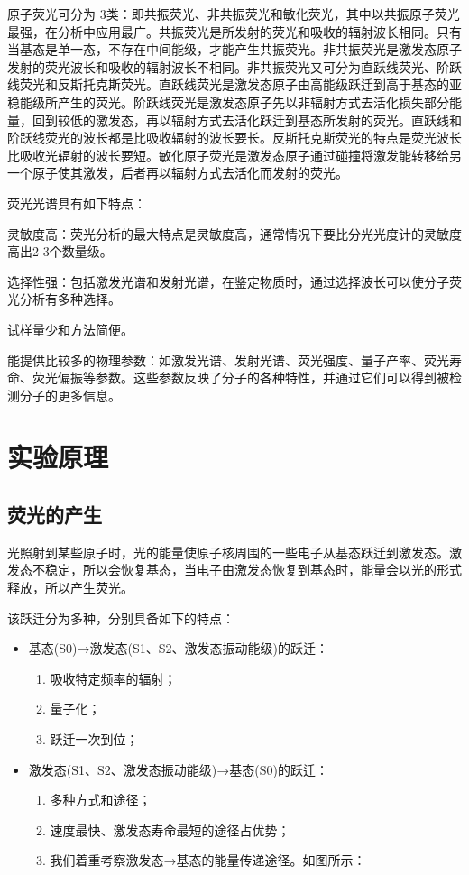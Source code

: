 \documentclass[hyperref]{ctexart}
\begin{document}
\begin{multicols}{2}
		原子荧光可分为 3类：即共振荧光、非共振荧光和敏化荧光，其中以共振原子荧光最强，在分析中应用最广。共振荧光是所发射的荧光和吸收的辐射波长相同。只有当基态是单一态，不存在中间能级，才能产生共振荧光。非共振荧光是激发态原子发射的荧光波长和吸收的辐射波长不相同。非共振荧光又可分为直跃线荧光、阶跃线荧光和反斯托克斯荧光。直跃线荧光是激发态原子由高能级跃迁到高于基态的亚稳能级所产生的荧光。阶跃线荧光是激发态原子先以非辐射方式去活化损失部分能量，回到较低的激发态，再以辐射方式去活化跃迁到基态所发射的荧光。直跃线和阶跃线荧光的波长都是比吸收辐射的波长要长。反斯托克斯荧光的特点是荧光波长比吸收光辐射的波长要短。敏化原子荧光是激发态原子通过碰撞将激发能转移给另一个原子使其激发，后者再以辐射方式去活化而发射的荧光。
		
		荧光光谱具有如下特点：
		
		灵敏度高：荧光分析的最大特点是灵敏度高，通常情况下要比分光光度计的灵敏度高出2-3个数量级。
		
		选择性强：包括激发光谱和发射光谱，在鉴定物质时，通过选择波长可以使分子荧光分析有多种选择。
		
		试样量少和方法简便。
		
		能提供比较多的物理参数：如激发光谱、发射光谱、荧光强度、量子产率、荧光寿命、荧光偏振等参数。这些参数反映了分子的各种特性，并通过它们可以得到被检测分子的更多信息。
		\section{实验原理}
		\subsection{荧光的产生}
		光照射到某些原子时，光的能量使原子核周围的一些电子从基态跃迁到激发态。激发态不稳定，所以会恢复基态，当电子由激发态恢复到基态时，能量会以光的形式释放，所以产生荧光。
		
		该跃迁分为多种，分别具备如下的特点：
		\begin{itemize}
			\item	基态(S0)→激发态(S1、S2、激发态振动能级)的跃迁：
			\begin{enumerate}
				\item	吸收特定频率的辐射；
				\item	量子化；
				\item	跃迁一次到位；
			\end{enumerate}
			\item	激发态(S1、S2、激发态振动能级)→基态(S0)的跃迁：
			\begin{enumerate}
				\item	多种方式和途径；
				\item	速度最快、激发态寿命最短的途径占优势；
				\item	我们着重考察激发态→基态的能量传递途径。如图所示：
			\end{enumerate}
		\end{itemize}
		

\end{multicols}
\end{document}
